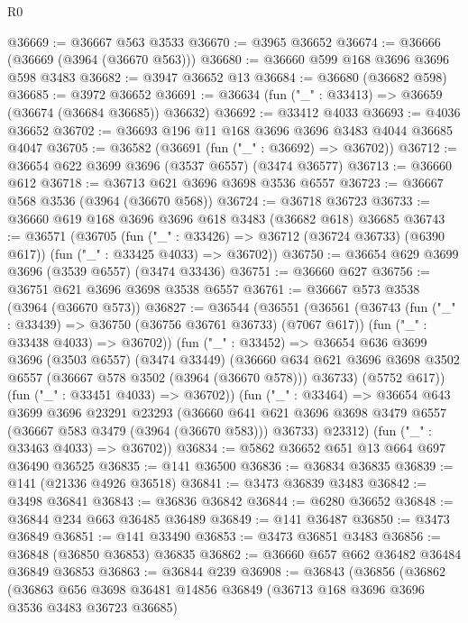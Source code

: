 \begin{lexlean}{R0}
\begin{coremodule}
@36669 := @36667 @563 @3533
@36670 := @3965 @36652
@36674 := @36666 (@36669 (@3964 (@36670 @563)))
@36680 := @36660 @599 @168 @3696 @3696 @598 @3483
@36682 := @3947 @36652 @13
@36684 := @36680 (@36682 @598)
@36685 := @3972 @36652
@36691 := @36634 (fun ("_" : @33413) => @36659 (@36674 (@36684 @36685)) @36632)
@36692 := @33412 @4033
@36693 := @4036 @36652
@36702 := @36693 @196 @11 @168 @3696 @3696 @3483 @4044 @36685 @4047
@36705 := @36582 (@36691 (fun ("_" : @36692) => @36702))
@36712 := @36654 @622 @3699 @3696 (@3537 @6557) (@3474 @36577)
@36713 := @36660 @612
@36718 := @36713 @621 @3696 @3698 @3536 @6557
@36723 := @36667 @568 @3536 (@3964 (@36670 @568))
@36724 := @36718 @36723
@36733 := @36660 @619 @168 @3696 @3696 @618 @3483 (@36682 @618) @36685
@36743 := @36571
    (@36705
      (fun ("_" : @33426) => @36712 (@36724 @36733) (@6390 @617))
      (fun ("_" : @33425 @4033) => @36702))
@36750 := @36654 @629 @3699 @3696 (@3539 @6557) (@3474 @33436)
@36751 := @36660 @627
@36756 := @36751 @621 @3696 @3698 @3538 @6557
@36761 := @36667 @573 @3538 (@3964 (@36670 @573))
@36827 := @36544
    (@36551
      (@36561
        (@36743
          (fun ("_" : @33439) => @36750 (@36756 @36761 @36733) (@7067 @617))
          (fun ("_" : @33438 @4033) => @36702))
        (fun ("_" : @33452) =>
        @36654
          @636
          @3699
          @3696
          (@3503 @6557)
          (@3474 @33449)
          (@36660
            @634
            @621
            @3696
            @3698
            @3502
            @6557
            (@36667 @578 @3502 (@3964 (@36670 @578)))
            @36733)
          (@5752 @617))
        (fun ("_" : @33451 @4033) => @36702))
      (fun ("_" : @33464) =>
      @36654
        @643
        @3699
        @3696
        @23291
        @23293
        (@36660 @641 @621 @3696 @3698 @3479 @6557 (@36667 @583 @3479 (@3964 (@36670 @583))) @36733)
        @23312)
      (fun ("_" : @33463 @4033) => @36702))
@36834 := @5862 @36652 @651 @13 @664 @697 @36490 @36525
@36835 := @141 @36500
@36836 := @36834 @36835
@36839 := @141 (@21336 @4926 @36518)
@36841 := @3473 @36839 @3483
@36842 := @3498 @36841
@36843 := @36836 @36842
@36844 := @6280 @36652
@36848 := @36844 @234 @663 @36485 @36489
@36849 := @141 @36487
@36850 := @3473 @36849
@36851 := @141 @33490
@36853 := @3473 @36851 @3483
@36856 := @36848 (@36850 @36853) @36835
@36862 := @36660 @657 @662 @36482 @36484 @36849 @36853
@36863 := @36844 @239
@36908 := @36843
    (@36856
      (@36862
        (@36863
          @656
          @3698
          @36481
          @14856
          @36849
          (@36713 @168 @3696 @3696 @3536 @3483 @36723 @36685)

\end{coremodule}
\end{lexlean}
